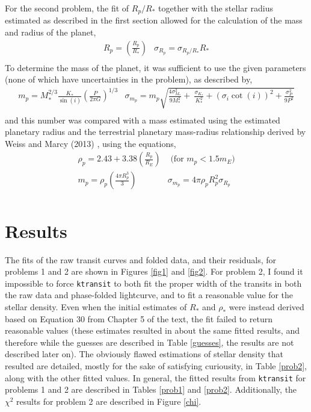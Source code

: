 \documentclass[10pt, preprint]{aastex}
\begin{document}
For the second problem, the fit of $R_p/R_*$ together with the stellar radius estimated as described in the first section allowed for the calculation of the mass and radius of the planet,
\begin{equation}
\begin{array}{ll}
R_p = \left(\frac{R_p}{R_*}\right) & \sigma_{R_p} = \sigma_{R_p/R_*}R_* \\
\end{array}
\end{equation}
To determine the mass of the planet, it was sufficient to use the given parameters (none of which have uncertainties in the problem), as described by, 
\begin{equation}
\begin{array}{ll}
  m_p = M_*^{2/3}\frac{K_*}{\sin(i)}\left(\frac{P}{2\pi G}\right)^{1/3} &
  \sigma_{m_p} = m_p\sqrt{\frac{4\sigma_{M_*}^2}{9M_*^2}+\
      \frac{\sigma_{K_*}}{K_*^2}+(\sigma_i\cot(i))^2+\frac{\sigma_P^2}{9P^2}}\\
\end{array}
\end{equation}
and this number was compared with a mass estimated using the estimated planetary radius and the terrestrial planetary mass-radius relationship derived by Weiss and Marcy (2013)
, using the equations,
\begin{equation}
\begin{array}{ll}
\rho_p=2.43+3.38\left(\frac{R_p}{R_E}\right) & \text{    (for $m_p<1.5m_E$)}\\
m_p = \rho_p\left(\frac{4\pi R_p^3}{3}\right) &
\sigma_{m_p} = 4\pi\rho_p R_p^2\sigma_{R_p}\\
\end{array}
\end{equation}

\section*{Results}
The fits of the raw transit curves and folded data, and their residuals, for problems 1 and 2 are shown in Figures \ref{fig1} and \ref{fig2}. For problem 2, I found it impossible to force \verb|ktransit| to both fit the proper width of the transits in both the raw data and phase-folded lightcurve, and to fit a reasonable value for the stellar density. Even when the initial estimates of $R_*$ and $\rho_*$ were instead derived based on Equation 30 from Chapter 5 of the text, the fit failed to return reasonable values (these estimates resulted in about the same fitted results, and therefore while the guesses are described in Table \ref{guesses}, the results are not described later on). The obviously flawed estimations of stellar density that resulted are detailed, mostly for the sake of satisfying curiousity, in Table \ref{prob2}, along with the other fitted values. In general, the fitted results from \verb|ktransit|  for problems 1 and 2 are described in Tables \ref{prob1} and \ref{prob2}. Additionally, the $\chi^2$ results for problem 2 are described in Figure \ref{chi}.
\end{document}
